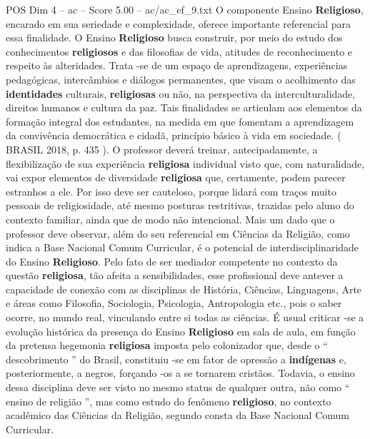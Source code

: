 \begin{textsample}{POS Dim 4 – ac – Score 5.00 – ac/ac\_ef\_9.txt}
O componente Ensino \textbf{Religioso}, encarado em sua seriedade e complexidade, oferece importante referencial para essa finalidade.
O Ensino \textbf{Religioso} busca construir, por meio do estudo dos conhecimentos \textbf{religiosos} e das filosofias de vida, atitudes de reconhecimento e respeito às alteridades.
Trata -se de um espaço de aprendizagens, experiências pedagógicas, intercâmbios e diálogos permanentes, que visam o acolhimento das \textbf{identidades} culturais, \textbf{religiosas} ou não, na perspectiva da interculturalidade, direitos humanos e cultura da paz.
Tais finalidades se articulam aos elementos da formação integral dos estudantes, na medida em que fomentam a aprendizagem da convivência democrática e cidadã, princípio básico à vida em sociedade. ( BRASIL 2018, p. 435 ).
O professor deverá treinar, antecipadamente, a flexibilização de sua experiência \textbf{religiosa} individual visto que, com naturalidade, vai expor elementos de diversidade \textbf{religiosa} que, certamente, podem parecer estranhos a ele.
Por isso deve ser cauteloso, porque lidará com traços muito pessoais de religiosidade, até mesmo posturas restritivas, trazidas pelo aluno do contexto familiar, ainda que de modo não intencional.
Mais um dado que o professor deve observar, além do seu referencial em Ciências da Religião, como indica a Base Nacional Comum Curricular, é o potencial de interdisciplinaridade do Ensino \textbf{Religioso}.
Pelo fato de ser mediador competente no contexto da questão \textbf{religiosa}, tão afeita a sensibilidades, esse profissional deve antever a capacidade de conexão com as disciplinas de História, Ciências, Linguagens, Arte e áreas como Filosofia, Sociologia, Psicologia, Antropologia etc., pois o saber ocorre, no mundo real, vinculando entre si todas as ciências.
É usual criticar -se a evolução histórica da presença do Ensino \textbf{Religioso} em sala de aula, em função da pretensa hegemonia \textbf{religiosa} imposta pelo colonizador que, desde o “ descobrimento ” do Brasil, constituiu -se em fator de opressão a \textbf{indígenas} e, posteriormente, a negros, forçando -os a se tornarem cristãos.
Todavia, o ensino dessa disciplina deve ser visto no mesmo status de qualquer outra, não como “ ensino de religião ”, mas como estudo do fenômeno \textbf{religioso}, no contexto acadêmico das Ciências da Religião, segundo consta da Base Nacional Comum Curricular.

\end{textsample}
